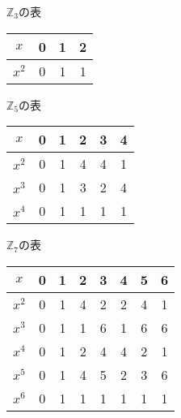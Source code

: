 \documentclass[11pt]{article}
\begin{document}
\begin{minipage}[t]{0.27\textwidth}
$\mathbb{Z}_3$の表\\
\begin{tabular}{|c|c|c|c|}
\hline
$x$ & 0 & 1 & 2\\
\hline
$x^2$ & 0 & 1 & 1\\
\hline
\end{tabular}
\end{minipage}
\hfill
\begin{minipage}[t]{0.27\textwidth}
$\mathbb{Z}_5$の表\\
\begin{tabular}{|c|c|c|c|c|c|}
\hline
$x$ & 0 & 1 & 2 & 3 & 4\\
\hline
$x^2$ & 0 & 1 & 4 & 4 & 1\\
\hline
$x^3$ & 0 & 1 & 3 & 2 & 4\\
\hline
$x^4$ & 0 & 1 & 1 & 1 & 1\\
\hline
\end{tabular}
\end{minipage}
\hfill
\begin{minipage}[t]{0.27\textwidth}
$\mathbb{Z}_7$の表\\
\begin{tabular}{|c|c|c|c|c|c|c|c|}
\hline
$x$    & 0 & 1 & 2 & 3 & 4 & 5 & 6\\
\hline
$x^2$ & 0 & 1 & 4 & 2 & 2 & 4 & 1\\
\hline
$x^3$ & 0 & 1 & 1 & 6 & 1 & 6 & 6\\
\hline
$x^4$ & 0 & 1 & 2 & 4 & 4 & 2 & 1\\
\hline
$x^5$ & 0 & 1 & 4 & 5 & 2 & 3 & 6\\
\hline
$x^6$ & 0 & 1 & 1 & 1 & 1 & 1 & 1\\
\hline
\end{tabular}
\end{minipage}

\vspace{5mm}
\end{document}
